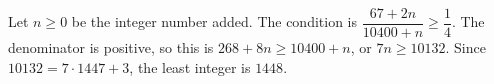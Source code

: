 Let $n\ge0$ be the integer number added. The condition is $\dfrac{67+2n}{10400+n}\ge\dfrac{1}{4}$. The denominator is positive, so this is $268+8n\ge10400+n$, or $7n\ge10132$. Since $10132=7\cdot1447+3$, the least integer is $\boxed{1448}$.
